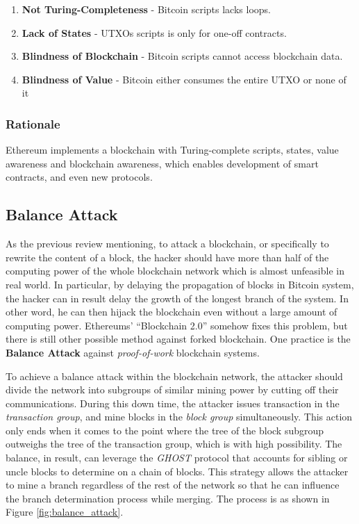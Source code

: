 \documentclass[12pt]{article}
\begin{document}
\begin{enumerate}
    \item \textbf{Not Turing-Completeness} - Bitcoin scripts lacks loops.
    \item \textbf{Lack of States} - UTXOs scripts is only for one-off contracts.
    \item \textbf{Blindness of Blockchain} - Bitcoin scripts cannot access blockchain data.
    \item \textbf{Blindness of Value} - Bitcoin either consumes the entire UTXO or none of it
\end{enumerate}

\subsubsection{Rationale}

Ethereum implements a blockchain with Turing-complete scripts, states, value awareness and blockchain awareness, which enables development of smart contracts, and even new protocols\cite{wood2014ethereum}.

\subsection{Balance Attack}
\label{sec:Balance Attack}

As the previous review mentioning, to attack a blockchain, or specifically to rewrite the content of a block, the hacker should have more than half of the computing power of the whole blockchain network which is almost unfeasible in real world. In particular, by delaying the propagation of blocks in Bitcoin system, the hacker can in result delay the growth of the longest branch of the system. In other word, he can then hijack the blockchain even without a large amount of computing power. Ethereums' ``Blockchain 2.0'' somehow fixes this problem, but there is still other possible method against forked blockchain. One practice is the \textbf{Balance Attack} \cite{Gra16}\cite{NG17}\cite{NG16}against \textit{proof-of-work} blockchain systems.

To achieve a balance attack within the blockchain network, the attacker should divide the network into subgroups of similar mining power by cutting off their communications. During this down time, the attacker issues transaction in the \textit{transaction group}, and mine blocks in the \textit{block group} simultaneously. This action only ends when it comes to the point where the tree of the block subgroup outweighs the tree of the transaction group, which is with high possibility. The balance, in result, can leverage the \textit{GHOST} protocol that accounts for sibling or uncle blocks to determine on a chain of blocks. This strategy allows the attacker to mine a branch regardless of the rest of the network so that he can influence the branch determination process while merging\cite{NG17}. The process is as shown in Figure \ref{fig:balance_attack}.
\end{document}
